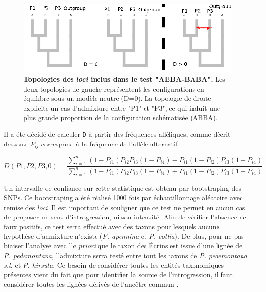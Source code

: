 \begin{figure}[!ht]
    \centering
    \includegraphics[width=1\textwidth]{fig/abba_mat.png}
    \caption{\textbf{Topologies des \textit{loci} inclus dans le test "ABBA-BABA".} Les deux topologies de gauche représentent les configurations en équilibre sous un modèle neutre (D=0). La topologie de droite explicite un cas d'admixture entre "P1" et "P3", ce qui induit une plus grande proportion de la configuration schématisée (ABBA).}
    \label{abba-top}
    \centering
\end{figure} 
Il a été décidé de calculer \verb|D| à partir des fréquences alléliques, comme décrit dessous.
 \textit{$P_{ij}$} correspond à la fréquence de l'allèle alternatif.

\[D(P1,P2,P3,0)=\frac{\sum_{i=1}^{n} (1-P_{i1})P_{i2}P_{i3}(1-P_{i4})-P_{i1}(1-P_{i2})P_{i3}(1-P_{i4})}{\sum_{i=1}^{n} (1-P_{i1})P_{i2}P_{i3}(1-P_{i4})+P_{i1}(1-P_{i2})P_{i3}(1-P_{i4})}\]

Un intervalle de confiance sur cette statistique est obtenu par bootstraping des SNPs. Ce bootstraping a été réalisé 1000 fois par échantillonnage aléatoire avec remise des \textit{loci}.
Il est important de souligner que ce test ne permet en aucun cas de proposer un sens d'introgression, ni son intensité. Afin de vérifier l'absence de faux positifs, ce test serra effectué avec des taxons pour lesquels aucune hypothèse d'admixture n'existe (\textit{P. apennina} et \textit{P. cottia}). De plus, pour ne pas biaiser l'analyse avec l'\textit{a priori} que le taxon des Écrins est issue d'une lignée de \textit{P. pedemontana}, l'admixture serra testé entre tout les taxons de \textit{P. pedemontana s.l.} et \textit{P. hirsuta}. Ce besoin de considérer toutes les entités taxonomiques présentes vient du fait que pour identifier la source de l'introgression, il faut considérer toutes les lignées dérivés de l'ancêtre commun \citep{Eaton2015}. 

